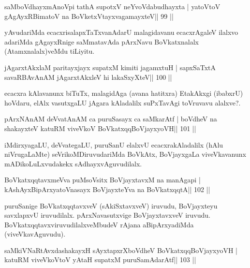 \begin{shl}
saMboVdhayxmAnoV\s pi tathA supotxV neYvoVdabudhayxta |
yatoV\s toV gAgAyxRBimatoV na BoVketxVtayxvagamayxteV\hfill || 99 ||
\end{shl}

\begin{artha}
yAvudariMda ecacxrisalapxTaTxvanAdarU malagidavanu ecacxrAgaleV ilalxvo adariMda gAgayxRnige saMmatavAda pArxNavu BoVkatxnalalx (Atamxnalalx)veMdu tiLiyitu.
\end{artha} 


\begin{shl}
jAgarxtAkxlaM paritayxjayx supatxM kimiti jagamxtuH |
sapxSaTxtA savaRBAvAnAM jAgarxtAkxleV hi lakaSxyXteV\hfill || 100 ||
\end{shl}

\begin{artha}
ecacxra kAlavanunx biTuTx, malagidAga (avana hatitxra) EtakAkxgi (ibabxrU) hoVdaru, elAlx vasutxgaLU jAgara kAladalilx suPxTavAgi toVruvavu  alalxve?.
\end{artha}


\begin{shl}
pArxNAnAM deVvatAnAM ca puruSasayx ca saMkarAtf |
boVdheV na shakayxteV katuRM viveVkoV BoVkatxqqBoVjayxyoVH\hfill || 101 ||
\end{shl}

\begin{artha}
iMdirxyagaLU, deVvategaLU, puruSanU elalxvU ecacxrakAladalilx (hAlu niVrugaLaMte) seVrikoMDiruvudariMda BoVkAtx, BoVjayxgaLa viveVkavanunx mADikoLuLxvudakekx sAdhayxvAguvudilalx.
\end{artha} 

\begin{shl}
BoVkatxqqtavxmeVva puMsoV\s sitx BoVjayxtavxM na manAgapi |
kAshAyxBipArxyatoV\s nasayx BoVjayxteYva na BoVkatxqqtA\hfill || 102 ||
\end{shl}

\begin{artha}
puruSanige BoVkatxqqtavxveV (sAkiSxtavxveV) iruvudu, BoVjayxteyu savxlapxvU iruvudilalx. pArxNavasutxvige BoVjayxtavxveV iruvudu. BoVkatxqqtavxviruvudilalxveMbudeV rAjana aBipArxyadiMda (viveVkavAguvudu).
\end{artha}

\begin{shl}
saMkiVNaRtAvxdashakayxH sAyxtapxrXboVdheV BoVkatxqqBoVjayxyoVH |
katuRM viveVkoV\s toV yAtaH supatxM puruSamAdarAtf\hfill || 103 ||
\end{shl}

